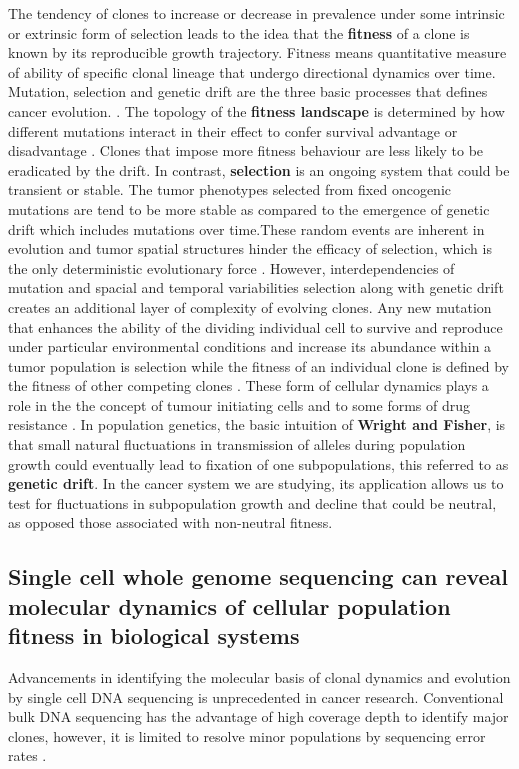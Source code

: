 The tendency of clones to increase or decrease in prevalence under some intrinsic or extrinsic form of selection leads to the idea that the \textbf{fitness} of a clone is known by its reproducible growth trajectory. Fitness means quantitative measure of ability of specific clonal lineage that undergo directional dynamics over time. 
Mutation, selection and genetic drift are the three basic processes that defines cancer evolution. \cite{lipinski2016cancer,szendro2013predictability}.
The topology of the \textbf{fitness landscape} is determined by how different mutations interact in their effect to confer survival advantage or disadvantage \cite{de2014empirical}. Clones that impose more fitness behaviour are less likely to be eradicated by the drift.
In contrast, \textbf{selection} is an ongoing system that could be transient or stable. The tumor phenotypes selected from fixed oncogenic mutations \cite{sidransky1992clonal,j2010mutator} are tend to be more stable as compared to the emergence of genetic drift which includes mutations over time.These random events are inherent in evolution and tumor spatial structures hinder the efficacy of selection, which is the only deterministic evolutionary force \cite{szendro2013predictability}.
However, interdependencies of mutation and spacial and temporal variabilities selection along with genetic drift creates an additional layer of complexity of evolving clones. Any new mutation that enhances the ability of the dividing individual cell to survive and reproduce under particular environmental conditions and increase its abundance within a tumor population is selection while the fitness of an individual clone is defined by the fitness of other competing clones \cite{jain2007deterministic,gerrish1998fate}. These form of cellular dynamics plays a role in the the concept of tumour initiating cells \cite{magee2012cancer} and to some forms of drug resistance \cite{shaffer2017rare, kreso2013variable}. In population genetics, the basic intuition of \textbf{Wright and Fisher}, is that small natural fluctuations in transmission of alleles during population growth could eventually lead to fixation of one subpopulations, this referred to as \textbf{genetic drift}. In the cancer system we are studying, its application allows us to test for fluctuations in subpopulation growth and decline that could be neutral, as opposed those associated with non-neutral fitness. 


\subsection{Single cell whole genome sequencing can reveal molecular dynamics of cellular population fitness in biological systems}
Advancements in identifying the molecular basis of clonal dynamics and evolution by single cell DNA sequencing is unprecedented in cancer research. Conventional bulk DNA sequencing has the advantage of high coverage depth to identify major clones, however, it is limited to resolve minor populations by sequencing error rates \cite{gerstung2012reliable}. 

